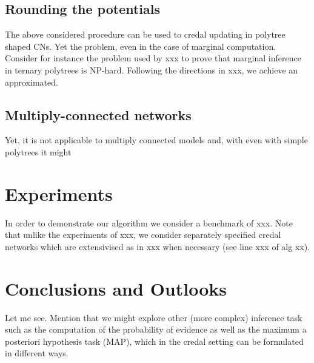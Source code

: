 \documentclass[twoside,11pt]{article}
\begin{document}
\subsection{Rounding the potentials}
The above considered procedure can be used to credal updating in polytree shaped CNs. Yet the problem, even in the case of marginal computation. Consider for instance the problem used by xxx to prove that marginal inference in ternary polytrees is NP-hard. Following the directions in xxx, we achieve an approximated.
\subsection{Multiply-connected networks}
Yet, it is not applicable to multiply connected models and, with even with simple polytrees it might
\section{Experiments}
In order to demonstrate our algorithm we consider a benchmark of xxx. Note that unlike the experiments of xxx, we consider separately specified credal networks which are extensivised as in xxx when necessary (see line xxx of alg xx).
\section{Conclusions and Outlooks}
Let me see. Mention that we might explore other (more complex) inference task such as the computation of the probability of evidence as well as the maximum a posteriori hypothesis task (MAP), which in the credal setting can be formulated in different ways.

\end{document}
